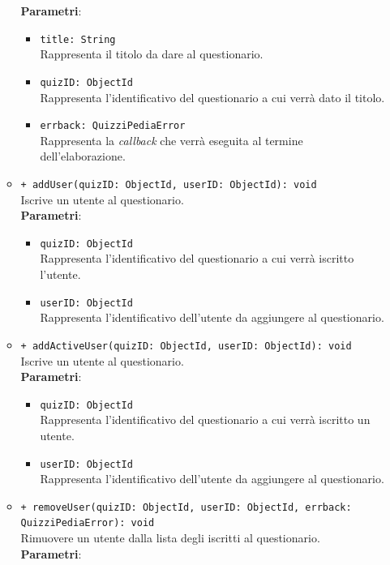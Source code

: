 \begin{itemize}
\begin{itemize}
			\textbf{Parametri}:
			\begin{itemize}
				\item \texttt{title: String}\\
				Rappresenta il titolo da dare al questionario.
				\item \texttt{quizID: ObjectId}\\
				Rappresenta l'identificativo del questionario a cui verrà dato il titolo.
				\item \texttt{errback: QuizziPediaError}\\
				Rappresenta la \textit{callback} che verrà eseguita al termine dell'elaborazione.
			\end{itemize}
			\item \texttt{+ addUser(quizID: ObjectId, userID: ObjectId): void}\\
			Iscrive un utente al questionario.\\
			\textbf{Parametri}:
			\begin{itemize}
				\item \texttt{quizID: ObjectId}\\
				Rappresenta l'identificativo del questionario a cui verrà iscritto l'utente.
				\item \texttt{userID: ObjectId}\\
				Rappresenta l'identificativo dell'utente da aggiungere al questionario.
			\end{itemize}
			\item \texttt{+ addActiveUser(quizID: ObjectId, userID: ObjectId): void}\\
			Iscrive un utente al questionario.\\
			\textbf{Parametri}:
			\begin{itemize}
				\item \texttt{quizID: ObjectId}\\
				Rappresenta l'identificativo del questionario a cui verrà iscritto un utente.
				\item \texttt{userID: ObjectId}\\
				Rappresenta l'identificativo dell'utente da aggiungere al questionario.
			\end{itemize}
			\item \texttt{+ removeUser(quizID: ObjectId, userID: ObjectId, errback: QuizziPediaError): void}\\
			Rimuovere un utente dalla lista degli iscritti al questionario.\\
			\textbf{Parametri}:
			\begin{itemize}

\end{itemize}
\end{itemize}
\end{itemize}
